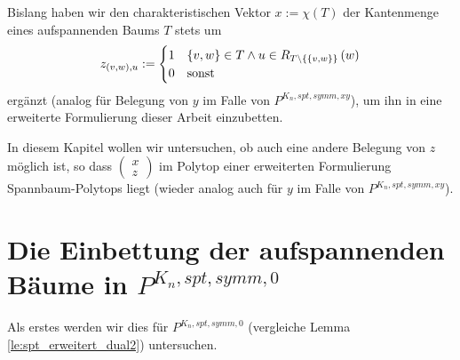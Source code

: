 \documentclass[10p,a4paper,BCOR = 12mm, DIV=15]{scrbook}
\begin{document}
Bislang haben wir den charakteristischen Vektor $x:=\chi\left(T\right)$ der Kantenmenge eines aufspannenden Baums $T$ stets um
\begin{displaymath}
z_{\left(v, w\right), u} := \begin{cases}
1 & \left\{v, w\right\}\in T\wedge u\in R_{T\backslash \left\{\left\{v, w\right\}\right\}}\left(w\right)\\
0 & \textnormal{sonst}
\end{cases}
\end{displaymath}
ergänzt (analog für Belegung von $y$ im Falle von $P^{K_n, spt, symm, xy}$), um ihn in eine erweiterte Formulierung dieser Arbeit einzubetten.

In diesem Kapitel wollen wir untersuchen, ob auch eine andere Belegung von $z$ möglich ist, so dass $\left(
\begin{array}{c}
x \\
z
\end{array}
\right)$ im Polytop einer erweiterten Formulierung Spannbaum-Polytops liegt (wieder analog auch für $y$ im Falle von $P^{K_n, spt, symm, xy}$).

\section{Die Einbettung der aufspannenden Bäume in $P^{K_n, spt, symm, 0}$}
\label{sec:einb_standard_symm}

Als erstes werden wir dies für $P^{K_n, spt, symm, 0}$ (vergleiche Lemma \ref{le:spt_erweitert_dual2}) untersuchen.
\end{document}
